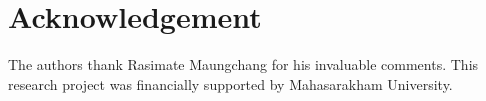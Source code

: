\documentclass[12pt]{amsart}
\newtheorem{theorem}{Theorem}
\begin{document}
\section*{Acknowledgement}
The authors thank Rasimate Maungchang for his invaluable comments.
This research project was financially supported by Mahasarakham University.



 
\end{document}
